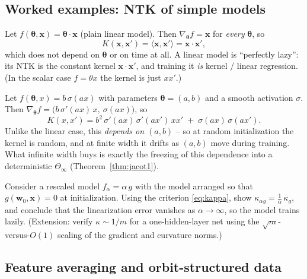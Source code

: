 \subsection{Worked examples: NTK of simple models}

\begin{example}
\label{ex:ntklinear}
Let $f(\boldsymbol\theta,\mathbf{x}) = \boldsymbol\theta\cdot\mathbf{x}$
(plain linear model). Then $\nabla_{\boldsymbol\theta} f = \mathbf{x}$ for
\emph{every} $\boldsymbol\theta$, so
\[
  K(\mathbf{x},\mathbf{x}') = \langle \mathbf{x}, \mathbf{x}'\rangle
  = \mathbf{x}\cdot\mathbf{x}',
\]
which does not depend on $\boldsymbol\theta$ or on time at all. A linear
model is ``perfectly lazy'': its NTK is the constant kernel
$\mathbf{x}\cdot\mathbf{x}'$, and training it \emph{is} kernel / linear
regression. (In the scalar case $f=\theta x$ the kernel is just $xx'$.)
\end{example}

\begin{example}
\label{ex:ntkunit}
Let $f(\boldsymbol\theta,x) = b\,\sigma(a x)$ with parameters
$\boldsymbol\theta=(a,b)$ and a smooth activation $\sigma$. Then
$\nabla_{\boldsymbol\theta} f = \big(b\,\sigma'(ax)\,x,\ \sigma(ax)\big)$,
so
\[
  K(x,x') = b^2\,\sigma'(ax)\,\sigma'(ax')\,x x' \;+\; \sigma(ax)\,\sigma(ax').
\]
Unlike the linear case, this \emph{depends on $(a,b)$} -- so at random
initialization the kernel is random, and at finite width it drifts as
$(a,b)$ move during training. What infinite width buys is exactly the
freezing of this dependence into a deterministic $\Theta_\infty$
(Theorem~\ref{thm:jacot1}).
\end{example}

\begin{problem}
\label{ex:rescaled}
Consider a rescaled model $f_\alpha = \alpha\, g$ with the model arranged so
that $g(\mathbf{w}_0,\mathbf{x})=0$ at initialization. Using the criterion
\eqref{eq:kappa}, show $\kappa_{\alpha g} = \tfrac{1}{\alpha}\,\kappa_g$,
and conclude that the linearization error vanishes as $\alpha\to\infty$, so
the model trains lazily. (Extension: verify $\kappa\sim 1/m$ for a
one-hidden-layer net using the $\sqrt{m}$-versus-$O(1)$ scaling of the
gradient and curvature norms.)
\end{problem}

\subsection{Feature averaging and orbit-structured data}

